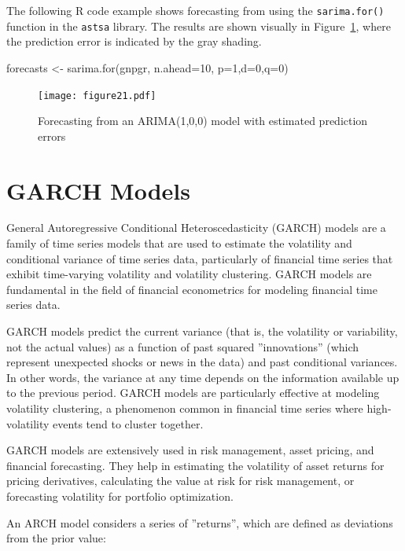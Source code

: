 The following R code example shows forecasting from using the \texttt{sarima.for()} function in the \texttt{astsa} library. The results are shown visually in Figure~\ref{fig:figure21}, where the prediction error is indicated by the gray shading.

\begin{Rcode}
forecasts <- sarima.for(gnpgr, n.ahead=10, p=1,d=0,q=0)
\end{Rcode}

\begin{figure}
\centering
\texttt{[image: figure21.pdf]}
\caption[Forecasting from an ARIMA(1,0,0) model]{Forecasting from an ARIMA(1,0,0) model with estimated prediction errors}
\label{fig:figure21}
\end{figure}

\section{GARCH Models}

General Autoregressive Conditional Heteroscedasticity (GARCH) models are a family of time series models that are used to estimate the volatility and conditional variance of time series data, particularly of financial time series that exhibit time-varying volatility and volatility clustering. GARCH models are fundamental in the field of financial econometrics for modeling financial time series data.

GARCH models predict the current variance (that is, the volatility or variability, not the actual values) as a function of past squared ''innovations'' (which represent unexpected shocks or news in the data) and past conditional variances. In other words, the variance at any time depends on the information available up to the previous period. GARCH models are particularly effective at modeling volatility clustering, a phenomenon common in financial time series where high-volatility events tend to cluster together.

GARCH models are extensively used in risk management, asset pricing, and financial forecasting. They help in estimating the volatility of asset returns for pricing derivatives, calculating the value at risk for risk management, or forecasting volatility for portfolio optimization. 

An ARCH model considers a series of ''returns'', which are defined as deviations from the prior value:

